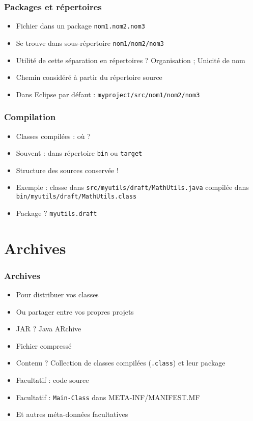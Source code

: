 \documentclass[english, french]{beamer}
\begin{document}
\begin{frame}
	\frametitle{Packages et répertoires}
	\begin{itemize}
		\item Fichier dans un package \texttt{nom1.nom2.nom3}
		\item Se trouve dans sous-répertoire \texttt{nom1/nom2/nom3}
		\item Utilité de cette séparation en répertoires ? \pause Organisation ; Unicité de nom
		\item Chemin considéré à partir du répertoire source
		\item Dans Eclipse par défaut : \texttt{myproject/src/nom1/nom2/nom3}
	\end{itemize}
\end{frame}

\begin{frame}
	\frametitle{Compilation}
	\begin{itemize}
		\item Classes compilées : où ? \pause
		\item Souvent : dans répertoire \texttt{bin} ou \texttt{target}
		\item Structure des sources conservée !
		\item Exemple : classe dans \texttt{src/myutils/draft/MathUtils.java} compilée dans \texttt{bin/myutils/draft/MathUtils.class}
		\item Package ? \pause \texttt{myutils.draft}
	\end{itemize}
\end{frame}

\section{Archives}
\begin{frame}
	\frametitle{Archives}
	\begin{itemize}
		\item Pour distribuer vos classes
		\item Ou partager entre vos propres projets
		\item JAR ? \pause Java ARchive
		\item Fichier compressé
		\item Contenu ? \pause Collection de classes compilées (\texttt{.class}) et leur package
		\item Facultatif : code source
		\item Facultatif : \texttt{Main-Class} {\tiny dans META-INF/MANIFEST.MF}
		\item Et autres méta-données facultatives
	\end{itemize}
\end{frame}
\end{document}
